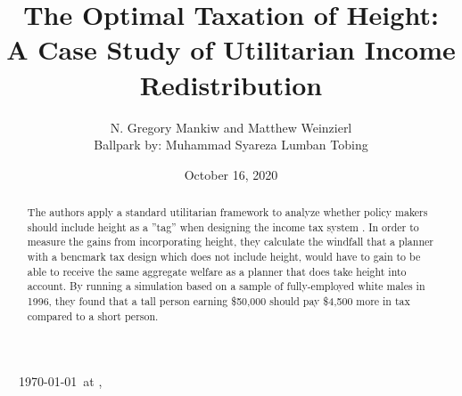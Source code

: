 \documentclass[titlepage]{\econtex}
\begin{document}
\providecommand{\versn}{}
\ifthenelse{\boolean{ifWeb}}{  \renewcommand{\ushort}{\underline}\renewcommand{\versn}{Web} }{} 

\hfill{\tiny \jobname~\versn~\today~{at} \DTMcurrenttime, ~~}

\title{The Optimal Taxation of Height: \\ A Case Study of Utilitarian Income Redistribution}

\author{N. Gregory Mankiw and Matthew Weinzierl \\ Ballpark by: Muhammad Syareza Lumban Tobing\authNum}



\renewcommand{\forcedate}{October 16, 2020}
\date{\forcedate}

\maketitle 
\hypertarget{abstract}{}
\begin{abstract}
 The authors apply a standard utilitarian framework to analyze whether policy makers should include height as a ''tag'' when designing the income tax system . In order to measure the gains from incorporating height, they calculate the windfall that a planner with a bencmark tax design which does not include height, would have to gain to be able to receive the same aggregate welfare as a planner that does take height into account. By running a simulation based on a sample of fully-employed white males in 1996, they found that a tall person earning \$50,000 should pay \$4,500 more in tax compared to a short person.
\end{abstract}

\begin{authorsinfo}
\end{authorsinfo}

\newcommand{\thankstext}{Thank you to Prof. Christopher D. Carroll for the template on which this paper is written.}
\end{document}
